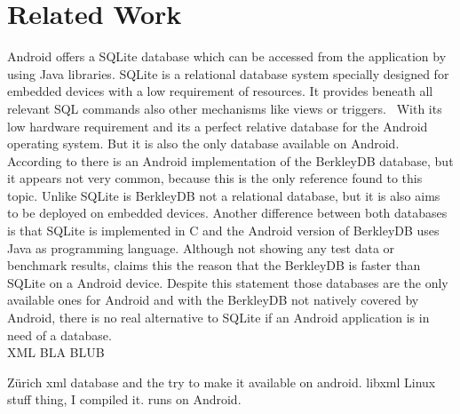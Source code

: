 \section{Related Work}
\label{sec:overview:related-work}
Android offers a SQLite database which can be accessed from the application by using Java libraries.
SQLite is a relational database system specially designed for embedded devices with a low requirement of resources.
It provides beneath all relevant SQL commands also other mechanisms like views or triggers.~\cite{owens2006definitive}
With its low hardware requirement and its a perfect relative database for the Android operating system.
But it is also the only database available on Android.
According to \cite{lamb2010berkleydb} there is an Android implementation of the BerkleyDB database, but it appears not very common, because this is the only reference found to this topic.
Unlike SQLite is BerkleyDB not a relational database, but it is also aims to be deployed on embedded devices.
Another difference between both databases is that SQLite is implemented in C and the Android version of BerkleyDB uses Java as programming language.
Although not showing any test data or benchmark results, \cite{lamb2010berkleydb} claims this the reason that the BerkleyDB is faster than SQLite on a Android device.
Despite this statement those databases are the only available ones for Android and with the BerkleyDB not natively covered by Android, there is no real alternative to SQLite if an Android application is in need of a database.\\
XML BLA BLUB



Zürich xml database and the try to make it available on android.
libxml Linux stuff thing, I compiled it. runs on Android.
